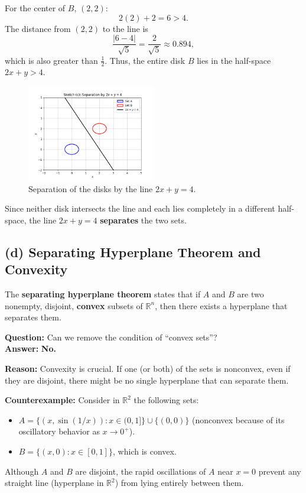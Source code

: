 \documentclass{article}
\begin{document}
For the center of $B$, $(2,2)$:
\[
2(2)+2 = 6 > 4.
\]
The distance from $(2,2)$ to the line is
\[
\frac{|6-4|}{\sqrt{5}} = \frac{2}{\sqrt{5}} \approx 0.894,
\]
which is also greater than $\tfrac{1}{2}$. Thus, the entire disk $B$ lies in the half-space $2x+y>4$.

\begin{figure}[H]
    \centering
    \includegraphics[width=0.5\textwidth]{c.png}
    \caption{Separation of the disks by the line $2x+y=4$.}
\end{figure}

Since neither disk intersects the line and each lies completely in a different half-space, the line $2x+y=4$ \textbf{separates} the two sets.

\subsection*{(d) Separating Hyperplane Theorem and Convexity}

The \textbf{separating hyperplane theorem} states that if $A$ and $B$ are two nonempty, disjoint, \textbf{convex} subsets of $\mathbb{R}^n$, then there exists a hyperplane that separates them.

\medskip
\textbf{Question:} Can we remove the condition of ``convex sets''?\\[5pt]
\textbf{Answer:} \textbf{No.}

\medskip
\textbf{Reason:} Convexity is crucial. If one (or both) of the sets is nonconvex, even if they are disjoint, there might be no single hyperplane that can separate them.

\medskip
\textbf{Counterexample:} Consider in $\mathbb{R}^2$ the following sets:
\begin{itemize}
    \item $A = \{(x,\sin(1/x)) : x \in (0,1]\} \cup \{(0,0)\}$ (nonconvex because of its oscillatory behavior as $x \to 0^+$).
    \item $B = \{(x,0) : x \in [0,1]\}$, which is convex.
\end{itemize}
Although $A$ and $B$ are disjoint, the rapid oscillations of $A$ near $x=0$ prevent any straight line (hyperplane in $\mathbb{R}^2$) from lying entirely between them.
\end{document}

